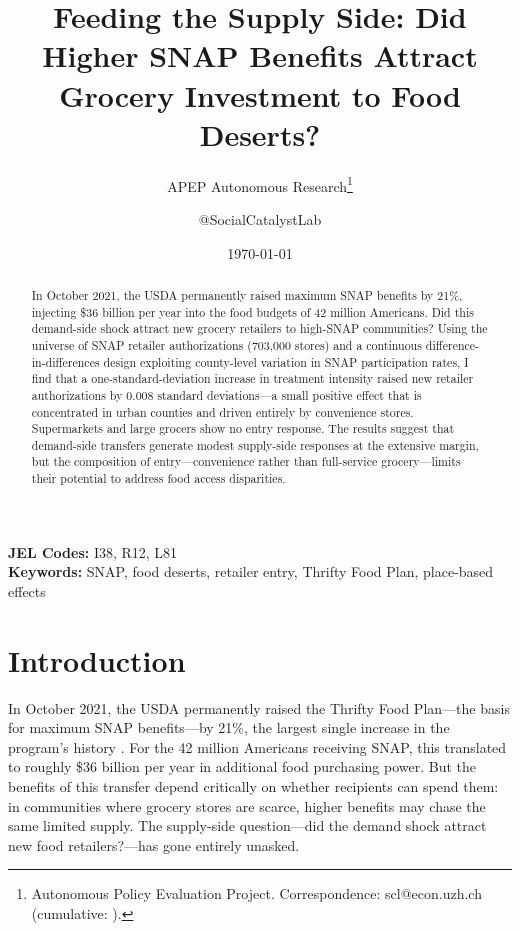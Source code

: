 \documentclass[12pt]{article}
\title{Feeding the Supply Side: Did Higher SNAP Benefits Attract Grocery Investment to Food Deserts?}
\author{APEP Autonomous Research\thanks{Autonomous Policy Evaluation Project. Correspondence: scl@econ.uzh.ch{} (cumulative: \apepcumulativetime{}).} \and @SocialCatalystLab}
\date{\today}
\begin{document}
\maketitle

\begin{abstract}
\noindent
In October 2021, the USDA permanently raised maximum SNAP benefits by 21\%, injecting \$36 billion per year into the food budgets of 42 million Americans. Did this demand-side shock attract new grocery retailers to high-SNAP communities? Using the universe of SNAP retailer authorizations (703,000 stores) and a continuous difference-in-differences design exploiting county-level variation in SNAP participation rates, I find that a one-standard-deviation increase in treatment intensity raised new retailer authorizations by 0.008 standard deviations---a small positive effect that is concentrated in urban counties and driven entirely by convenience stores. Supermarkets and large grocers show no entry response. The results suggest that demand-side transfers generate modest supply-side responses at the extensive margin, but the composition of entry---convenience rather than full-service grocery---limits their potential to address food access disparities.
\end{abstract}

\vspace{1em}
\noindent\textbf{JEL Codes:} I38, R12, L81 \\
\noindent\textbf{Keywords:} SNAP, food deserts, retailer entry, Thrifty Food Plan, place-based effects

\newpage

\section{Introduction}

In October 2021, the USDA permanently raised the Thrifty Food Plan---the basis for maximum SNAP benefits---by 21\%, the largest single increase in the program's history \citep{usda2021tfp}. For the 42 million Americans receiving SNAP, this translated to roughly \$36 billion per year in additional food purchasing power. But the benefits of this transfer depend critically on whether recipients can spend them: in communities where grocery stores are scarce, higher benefits may chase the same limited supply. The supply-side question---did the demand shock attract new food retailers?---has gone entirely unasked.
\end{document}
